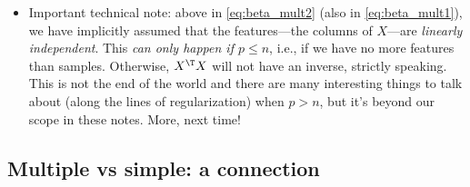 \documentclass{article}
\begin{document}
\begin{itemize}
\item Important technical note: above in \eqref{eq:beta_mult2} (also in
  \eqref{eq:beta_mult1}), we have implicitly assumed that the features---the 
  columns of $X$---are \emph{linearly independent}. This \emph{can only happen
    if $p \leq n$}, i.e., if we have no more features than samples. Otherwise,
  $X^\T X$ will not have an inverse, strictly speaking. This is not the end of
  the world and there are many interesting things to talk about (along the lines
  of regularization) when $p > n$, but it's beyond our scope in these notes. 
  More, next time! 
\end{itemize}

\subsection{Multiple vs simple: a connection}
\end{document}
